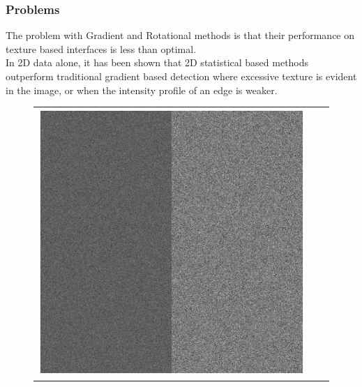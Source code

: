 \documentclass[9pt]{beamer}
\begin{document}
\begin{frame}
\frametitle{ Problems }
The problem with Gradient and Rotational methods is that their performance on texture based interfaces is less than optimal.\\

In 2D data alone, it has been shown that 2D statistical based methods outperform traditional gradient based detection where excessive texture is evident in the image, or when the intensity profile of an edge is weaker.

		\begin{figure}
		
			\begin{tabular}{c c c}
			
					\includegraphics[scale=0.2]{newstatinterface} &


\end{tabular}
\end{figure}
\end{frame}
\end{document}
